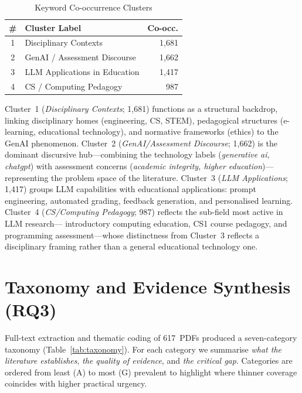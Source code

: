 \documentclass[conference]{IEEEtran}
\begin{document}
\begin{table}[ht]
\caption{Keyword Co-occurrence Clusters}
\label{tab:clusters}
\centering
\begin{tabular}{clr}
\toprule
\textbf{\#} & \textbf{Cluster Label} & \textbf{Co-occ.} \\
\midrule
1 & Disciplinary Contexts       & 1,681 \\
2 & GenAI / Assessment Discourse & 1,662 \\
3 & LLM Applications in Education & 1,417 \\
4 & CS / Computing Pedagogy     & 987   \\
\bottomrule
\end{tabular}
\end{table}

Cluster~1 (\textit{Disciplinary Contexts}; 1,681) functions as a structural backdrop, linking
disciplinary homes (engineering, CS, STEM), pedagogical structures (e-learning, educational
technology), and normative frameworks (ethics) to the GenAI phenomenon. Cluster~2
(\textit{GenAI/Assessment Discourse}; 1,662) is the dominant discursive hub---combining the
technology labels (\textit{generative ai, chatgpt}) with assessment concerns (\textit{academic
integrity, higher education})---representing the problem space of the literature. Cluster~3
(\textit{LLM Applications}; 1,417) groups LLM capabilities with educational applications: prompt
engineering, automated grading, feedback generation, and personalised learning. Cluster~4
(\textit{CS/Computing Pedagogy}; 987) reflects the sub-field most active in LLM research---
introductory computing education, CS1 course pedagogy, and programming assessment---whose
distinctness from Cluster~3 reflects a disciplinary framing rather than a general educational
technology one.

\section{Taxonomy and Evidence Synthesis (RQ3)}
\label{sec:taxonomy}

Full-text extraction and thematic coding of 617~PDFs produced a seven-category taxonomy
(Table~\ref{tab:taxonomy}). For each category we summarise \textit{what the literature
establishes}, \textit{the quality of evidence}, and \textit{the critical gap}. Categories are
ordered from least (A) to most (G) prevalent to highlight where thinner coverage coincides with
higher practical urgency.
\end{document}
